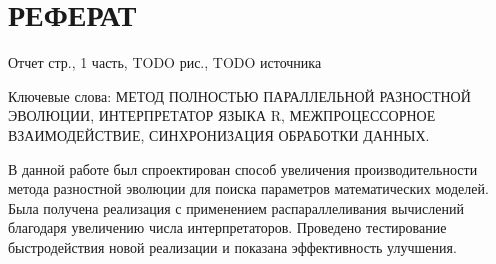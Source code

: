 \chapter*{РЕФЕРАТ}

Отчет \pageref{LastPage} стр., 1 часть, TODO рис., TODO источника

Ключевые слова: МЕТОД ПОЛНОСТЬЮ ПАРАЛЛЕЛЬНОЙ РАЗНОСТНОЙ ЭВОЛЮЦИИ, ИНТЕРПРЕТАТОР ЯЗЫКА R, МЕЖПРОЦЕССОРНОЕ ВЗАИМОДЕЙСТВИЕ, СИНХРОНИЗАЦИЯ ОБРАБОТКИ ДАННЫХ.

В данной работе был спроектирован способ увеличения производительности метода разностной эволюции для поиска параметров математических моделей.
Была получена реализация с применением распараллеливания вычислений благодаря увеличению числа интерпретаторов.
Проведено тестирование быстродействия новой реализации и показана эффективность улучшения.

